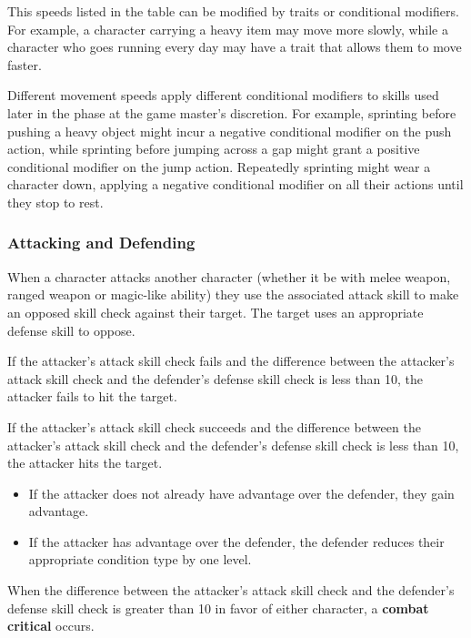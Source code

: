 \documentclass[11pt]{article}
\begin{document}
This speeds listed in the table can be modified by traits or conditional modifiers.
For example, a character carrying a heavy item may move more slowly, while a character who goes running every day may have a trait that allows them to move faster.

Different movement speeds apply different conditional modifiers to skills used later in the phase at the game master's discretion.
For example, sprinting before pushing a heavy object might incur a negative conditional modifier on the push action, while sprinting before jumping across a gap might grant a positive conditional modifier on the jump action.
Repeatedly sprinting might wear a character down, applying a negative conditional modifier on all their actions until they stop to rest.

\subsubsection{Attacking and Defending}
When a character attacks another character (whether it be with melee weapon, ranged weapon or magic-like ability) they use the associated attack skill to make an opposed skill check against their target.
The target uses an appropriate defense skill to oppose.

If the attacker's attack skill check fails and the difference between the attacker's attack skill check and the defender's defense skill check is less than 10, the attacker fails to hit the target.

If the attacker's attack skill check succeeds and the difference between the attacker's attack skill check and the defender's defense skill check is less than 10, the attacker hits the target.

\begin{itemize}
	\item If the attacker does not already have advantage over the defender, they gain advantage.
	\item If the attacker has advantage over the defender, the defender reduces their appropriate condition type by one level.
\end{itemize}

When the difference between the attacker's attack skill check and the defender's defense skill check is greater than 10 in favor of either character, a \textbf{combat critical} occurs.
\end{document}
